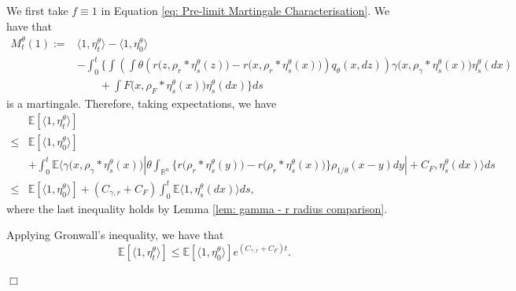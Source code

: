 \documentclass[12pt]{article}
\newenvironment {proof}{{\noindent\bf Proof }}{\hfill $\Box$ \medskip}
\begin{document}
\begin{proof}
We first take $f \equiv 1$ in Equation \eqref{eq: Pre-limit Martingale Characterisation}. We have that 
\begin{equation}
    \label{eq: Total Mass Martingale Characterisation}
\begin{aligned}
     M^{\theta}_t(1):=&  \langle 1,\eta^{\theta}_t \rangle
        -\langle 1,\eta^{\theta}_0 \rangle\\
 &-  \int_{0}^{t}\bigg\{   \int\left(   \int \theta
 \left(
        r\big(z,\rho_{r}*\eta^{\theta}_{s}(z)\big)
            -r\big(x,\rho_{r}*\eta^{\theta}_{s}(x)\big)
            \right)
                    q_\theta(x,dz)\right)
                            \gamma\big(x,\rho_{\gamma}*\eta^{\theta}_{s}(x)\big)
                            \eta^{\theta}_{s}(dx)\\
& \qquad +\int F\big(x,\rho_{F}*\eta^{\theta}_{s}(x)\big)
\eta^{\theta}_{s}(dx)\bigg\} ds
\end{aligned}    
\end{equation}
is a martingale.
Therefore, taking expectations, we have
\begin{equation}\label{eq: Total mass control generalised}
\begin{aligned}
&\mathbb{E}[\langle 1 ,\eta^{\theta}_{t}\rangle] \\
\leq &  \mathbb{E}[\langle 1 ,\eta^{\theta}_{0}\rangle] \\
&+ \int_{0}^{t}\mathbb{E}\bigg\langle
        \gamma\big(x,\rho_{\gamma}*\eta^{\theta}_{s}(x)\big)
            \left| \theta \int_{\mathbb{R}^n}
                    \big\{r\big(\rho_{r}*\eta^{\theta}_s(y)\big)-r\big(\rho_{r}*\eta^{\theta}_s(x)\big)\big\}
                    \rho_{1/\theta}(x-y)dy\right| + C_F 
                            ,\eta^{\theta}_s(dx)  \bigg\rangle ds\\
\leq &  \mathbb{E}[\langle 1 ,\eta^{\theta}_{0}\rangle] + (C_{\gamma,r} + C_F)\int_{0}^{t}\mathbb{E} \langle 1  ,\eta^{\theta}_s(dx) \rangle ds,
\end{aligned}
\end{equation}
where the last inequality holds by Lemma \ref{lem: gamma - r radius comparison}.

Applying Gronwall's inequality, we have that 
\begin{equation}
 \mathbb{E}[\langle 1 ,\eta^{\theta}_{t}\rangle] \leq \mathbb{E}[\langle 1 ,\eta^{\theta}_{0}\rangle]e^{(C_{\gamma,r}+C_F)t}.   
\end{equation}


\end{proof}
\end{document}
